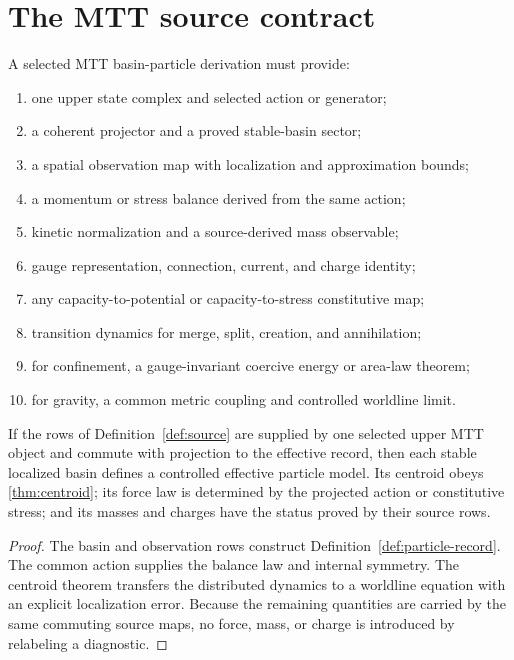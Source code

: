 \documentclass[11pt]{article}
\begin{document}
\section{The MTT source contract}

\begin{definition}
\label{def:source}
A selected MTT basin-particle derivation must provide:
\begin{enumerate}
\item one upper state complex and selected action or generator;
\item a coherent projector and a proved stable-basin sector;
\item a spatial observation map with localization and approximation bounds;
\item a momentum or stress balance derived from the same action;
\item kinetic normalization and a source-derived mass observable;
\item gauge representation, connection, current, and charge identity;
\item any capacity-to-potential or capacity-to-stress constitutive map;
\item transition dynamics for merge, split, creation, and annihilation;
\item for confinement, a gauge-invariant coercive energy or area-law theorem;
\item for gravity, a common metric coupling and controlled worldline limit.
\end{enumerate}
\end{definition}

\begin{theorem}\label{thm:encoding}
If the rows of Definition~\ref{def:source} are supplied by one selected upper
MTT object and commute with projection to the effective record, then each
stable localized basin defines a controlled effective particle model.  Its
centroid obeys \cref{thm:centroid}; its force law is determined by the
projected action or constitutive stress; and its masses and charges have the
status proved by their source rows.
\end{theorem}

\begin{proof}
The basin and observation rows construct
Definition~\ref{def:particle-record}.  The common action supplies the balance
law and internal symmetry.  The centroid theorem transfers the distributed
dynamics to a worldline equation with an explicit localization error.
Because the remaining quantities are carried by the same commuting source
maps, no force, mass, or charge is introduced by relabeling a diagnostic.
\end{proof}
\end{document}
